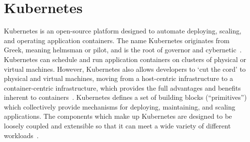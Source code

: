 \section{Kubernetes}

Kubernetes is an open-source platform designed to automate deploying, scaling, and operating application containers. The name Kubernetes originates from Greek, meaning helmsman or pilot, and is the root of governor and cybernetic~\cite{hid-sp18-510-web-Kubernetes}. Kubernetes can schedule and run application containers on clusters of physical or virtual machines. However, Kubernetes also allows developers to ‘cut the cord’ to physical and virtual machines, moving from a host-centric infrastructure to a container-centric infrastructure, which provides the full advantages and benefits inherent to containers~\cite{hid-sp18-510-web-Kubernetes}. Kubernetes defines a set of building blocks (``primitives'') which collectively provide mechanisms for deploying, maintaining, and scaling applications. The components which make up Kubernetes are designed to be loosely coupled and extensible so that it can meet a wide variety of different workloads~\cite{hid-sp18-510-wiki-Kubernetes}.
